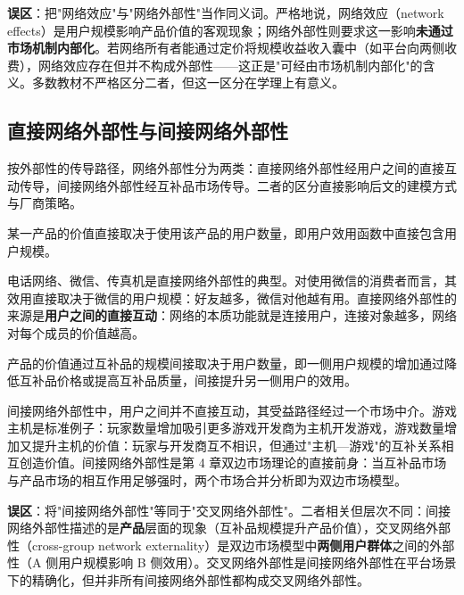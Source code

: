 \begin{misconception}
\textbf{误区}：把"网络效应"与"网络外部性"当作同义词。严格地说，网络效应（network effects）是用户规模影响产品价值的客观现象；网络外部性则要求这一影响\textbf{未通过市场机制内部化}。若网络所有者能通过定价将规模收益收入囊中（如平台向两侧收费），网络效应存在但并不构成外部性——这正是"可经由市场机制内部化"的含义。多数教材不严格区分二者，但这一区分在学理上有意义。
\end{misconception}

\subsection{直接网络外部性与间接网络外部性}

按外部性的传导路径，网络外部性分为两类：直接网络外部性经用户之间的直接互动传导，间接网络外部性经互补品市场传导。二者的区分直接影响后文的建模方式与厂商策略。

\begin{definition}
某一产品的价值直接取决于使用该产品的用户数量，即用户效用函数中直接包含用户规模。
\end{definition}

电话网络、微信、传真机是直接网络外部性的典型。对使用微信的消费者而言，其效用直接取决于微信的用户规模：好友越多，微信对他越有用。直接网络外部性的来源是\textbf{用户之间的直接互动}：网络的本质功能就是连接用户，连接对象越多，网络对每个成员的价值越高。

\begin{definition}
产品的价值通过互补品的规模间接取决于用户数量，即一侧用户规模的增加通过降低互补品价格或提高互补品质量，间接提升另一侧用户的效用。
\end{definition}

间接网络外部性中，用户之间并不直接互动，其受益路径经过一个市场中介。游戏主机是标准例子：玩家数量增加吸引更多游戏开发商为主机开发游戏，游戏数量增加又提升主机的价值：玩家与开发商互不相识，但通过"主机—游戏"的互补关系相互创造价值。间接网络外部性是第 4 章双边市场理论的直接前身：当互补品市场与产品市场的相互作用足够强时，两个市场合并分析即为双边市场模型。

\begin{misconception}
\textbf{误区}：将"间接网络外部性"等同于"交叉网络外部性"。二者相关但层次不同：间接网络外部性描述的是\textbf{产品}层面的现象（互补品规模提升产品价值），交叉网络外部性（cross-group network externality）是双边市场模型中\textbf{两侧用户群体}之间的外部性（A 侧用户规模影响 B 侧效用）。交叉网络外部性是间接网络外部性在平台场景下的精确化，但并非所有间接网络外部性都构成交叉网络外部性。
\end{misconception}

